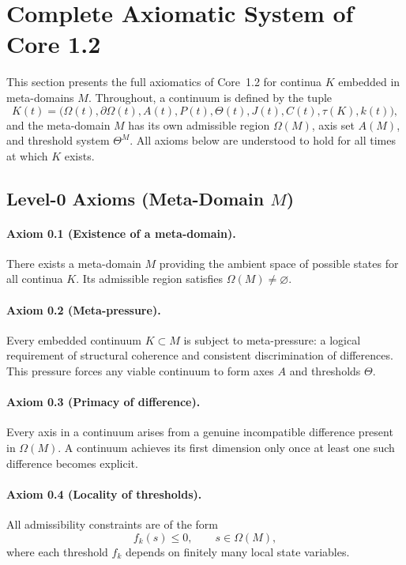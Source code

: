 \section{Complete Axiomatic System of Core 1.2}
\label{sec:axioms-full}

This section presents the full axiomatics of Core~1.2 for continua \(K\) embedded in meta-domains \(M\).
Throughout, a continuum is defined by the tuple
\[
  K(t) = \bigl(\Omega(t),\partial\Omega(t),A(t),P(t),\Theta(t),J(t),C(t),\tau(K),k(t)\bigr),
\]
and the meta-domain \(M\) has its own admissible region \(\Omega(M)\), axis set \(A(M)\), and threshold system \(\Theta^M\).
All axioms below are understood to hold for all times at which \(K\) exists.

\subsection{Level-0 Axioms (Meta-Domain \texorpdfstring{\(M\)}{M})}

\paragraph{Axiom 0.1 (Existence of a meta-domain).}
There exists a meta-domain \(M\) providing the ambient space of possible states for all continua \(K\).
Its admissible region satisfies \(\Omega(M)\neq \varnothing\).

\paragraph{Axiom 0.2 (Meta-pressure).}
Every embedded continuum \(K\subset M\) is subject to meta-pressure: a logical requirement of structural coherence and consistent discrimination of differences.
This pressure forces any viable continuum to form axes \(A\) and thresholds \(\Theta\).

\paragraph{Axiom 0.3 (Primacy of difference).}
Every axis in a continuum arises from a genuine incompatible difference present in \(\Omega(M)\).
A continuum achieves its first dimension only once at least one such difference becomes explicit.

\paragraph{Axiom 0.4 (Locality of thresholds).}
All admissibility constraints are of the form
\[
  f_k(s)\le 0,\qquad s\in \Omega(M),
\]
where each threshold \(f_k\) depends on finitely many local state variables.

